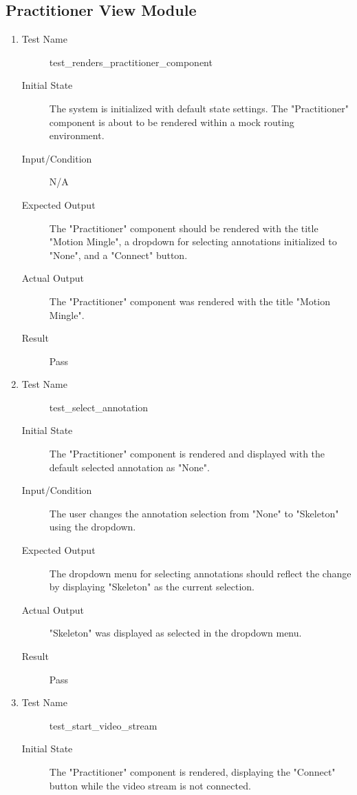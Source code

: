 \documentclass[12pt, titlepage]{article}
\begin{document}
\subsection{Practitioner View Module}
\begin{enumerate}[UT-PV1]
\item \label{UT-PV1}
  \begin{description}
  \item[Test Name] test\_renders\_practitioner\_component
  \item[Initial State] The system is initialized with default state settings.
    The "Practitioner" component is about to be rendered within a mock routing
    environment.
  \item[Input/Condition] N/A
  \item[Expected Output] The "Practitioner" component should be rendered with
    the title "Motion Mingle", a dropdown for selecting annotations initialized
    to "None", and a "Connect" button.
  \item[Actual Output] The "Practitioner" component was rendered with the title
    "Motion Mingle".
  \item[Result] Pass
  \end{description}
\item \label{UT-PV2}
  \begin{description}
  \item[Test Name] test\_select\_annotation
  \item[Initial State] The "Practitioner" component is rendered and displayed
    with the default selected annotation as "None".
  \item[Input/Condition] The user changes the annotation selection from "None"
    to "Skeleton" using the dropdown.
  \item[Expected Output] The dropdown menu for selecting annotations should
    reflect the change by displaying "Skeleton" as the current selection.
  \item[Actual Output] "Skeleton" was displayed as selected in the dropdown
    menu.
  \item[Result] Pass
  \end{description}
\item \label{UT-PV3}
  \begin{description}
  \item[Test Name] test\_start\_video\_stream
  \item[Initial State] The "Practitioner" component is rendered, displaying the
    "Connect" button while the video stream is not connected.

\end{description}
\end{enumerate}
\end{document}
